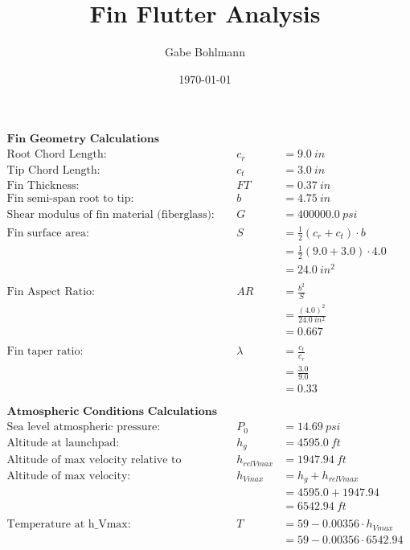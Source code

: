 \documentclass{article}
\title{Fin Flutter Analysis}
\author{Gabe Bohlmann}
\date{\today}
\begin{document}
	\begin{align*}
		\textbf{Fin Geometry Calculations} \\
		\text{Root Chord Length:}& &c_{r} &=\SI{9.0}{in} \\
		\text{Tip Chord Length:}& &c_{t} &= \SI{3.0}{in} \\
		\text{Fin Thickness:}& &FT &= \SI{0.37}{in} \\
		\text{Fin semi-span root to tip:}& &b &= \SI{4.75}{in} \\
		\text{Shear modulus of fin material (fiberglass):}& &G &= \SI{400000.0}{psi} \\
		\text{Fin surface area:}& &S &= \frac{1}{2} \left( c_{r} + c_{t} \right) \cdot b \tag{eqn. 1} \\
		&& &= \frac{1}{2} \left( 9.0 + 3.0 \right) \cdot4.0\\
		&& &= \SI{24.0}{in^2} \\ \\
		\text{Fin Aspect Ratio:}& &AR &= \frac{b^2}{S} \tag{eqn. 2} \\
		&& &= \frac{\left(4.0\right)^2}{\SI{24.0}{in^2}} \\
		&& &= 0.667\\ \\
		\text{Fin taper ratio:}& &\lambda &= \frac{c_{t}}{c_{r}} \tag{eqn. 3} \\
		&& &= \frac{3.0}{9.0} \\
		&& &= 0.33\\
		\\ \\
		\textbf{Atmospheric Conditions Calculations} \\
		\text{Sea level atmospheric pressure:}& &P_{0} &= \SI{14.69}{psi} \\
		\text{Altitude at launchpad:}& &h_{g} &= \SI{4595.0}{ft} \\
		\text{Altitude of max velocity relative to launchpad:}& &h_{relVmax} &= \SI{1947.94}{ft} \\
		\text{Altitude of max velocity:}& &h_{Vmax} &= h_{g} + h_{relVmax} \\ \tag{eqn.4}
		&& &= 4595.0 + 1947.94 \\
		&& &= \SI{6542.94}{ft} \\ \\
		\text{Temperature at h\_Vmax:}& &T &= 59 - 0.00356 \cdot h_{Vmax} \tag{eqn. 5}\\
		&& &= 59 - 0.00356 \cdot 6542.94\\

\end{align*}
\end{document}
